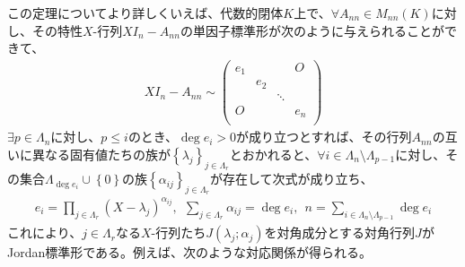 \documentclass[dvipdfmx]{jsarticle}
\begin{document}
この定理についてより詳しくいえば、代数的閉体$K$上で、$\forall A_{nn} \in M_{nn}(K)$に対し、その特性$X$-行列$XI_{n} - A_{nn}$の単因子標準形が次のように与えられることができて、
\begin{align*}
XI_{n} - A_{nn} \sim \begin{pmatrix}
e_{1} & \  & \  & O \\
\  & e_{2} & \  & \  \\
\  & \  & \ddots & \  \\
O & \  & \  & e_{n} \\
\end{pmatrix}
\end{align*}
$\exists p \in \varLambda_{n}$に対し、$p \leq i$のとき、$\deg e_{i} > 0$が成り立つとすれば、その行列$A_{nn}$の互いに異なる固有値たちの族が$\left\{ \lambda_{j} \right\}_{j \in \varLambda_{r}}$とおかれると、$\forall i \in \varLambda_{n} \setminus \varLambda_{p - 1}$に対し、その集合$\varLambda_{\deg e_{i}} \cup \left\{ 0 \right\}$の族$\left\{ \alpha_{ij} \right\}_{j \in \varLambda_{r}}$が存在して次式が成り立ち、
\begin{align*}
e_{i} = \prod_{j \in \varLambda_{r}} \left( X - \lambda_{j} \right)^{\alpha_{ij}},\ \ \sum_{j \in \varLambda_{r}} \alpha_{ij} = {\deg }e_{i},\ \ n = \sum_{i \in \varLambda_{n} \setminus \varLambda_{p - 1}} {\deg e_{i}}
\end{align*}
これにより、$j \in \varLambda_{r}$なる$X$-行列たち$J\left( \lambda_{j};\alpha_{j} \right)$を対角成分とする対角行列$J$がJordan標準形である。例えば、次のような対応関係が得られる。
\end{document}
